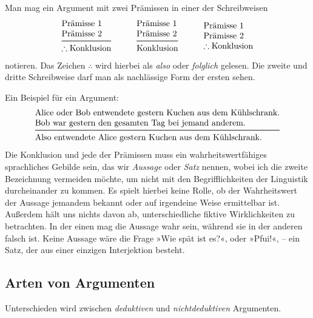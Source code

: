 Man mag ein Argument mit zwei Prämissen in einer der Schreibweisen
\[\begin{array}{@{}l@{}}
\text{Prämisse 1}\\
\text{Prämisse 2}\\
\midrule[\inferrulewidth]
\therefore\text{Konklusion}
\end{array}
\qquad\quad
\begin{array}{@{}l@{}}
\text{Prämisse 1}\\
\text{Prämisse 2}\\
\midrule[\inferrulewidth]
\text{Konklusion}
\end{array}
\qquad\quad
\begin{array}{@{}l@{}}
\text{Prämisse 1}\\
\text{Prämisse 2}\\
\therefore\text{Konklusion}
\end{array}
\]
notieren. Das Zeichen $\therefore$ wird hierbei als \emph{also} oder
\emph{folglich} gelesen. Die zweite und dritte Schreibweise darf man
als nachlässige Form der ersten sehen.

Ein Beispiel für ein Argument:
\[\begin{array}{@{}l@{}}
\text{Alice oder Bob entwendete gestern Kuchen aus dem Kühlschrank.}\\
\text{Bob war gestern den gesamten Tag bei jemand anderem.}\\
\midrule[\inferrulewidth]
\text{Also entwendete Alice gestern Kuchen aus dem Kühlschrank.}
\end{array}\]
Die Konklusion und jede der Prämissen muss ein wahrheitswertfähiges
sprachliches Gebilde sein, das wir \emph{Aussage} oder \emph{Satz}
nennen, wobei ich die zweite Bezeichnung vermeiden möchte, um nicht
mit den Begrifflichkeiten der Linguistik durcheinander zu kommen. Es
spielt hierbei keine Rolle, ob der Wahrheitswert der Aussage jemandem
bekannt oder auf irgendeine Weise ermittelbar ist.
Außerdem hält uns nichts davon ab, unterschiedliche fiktive Wirklichkeiten
zu betrachten. In der einen mag die Aussage wahr sein, während sie in der
anderen falsch ist. Keine Aussage wäre die Frage »Wie spät ist es?«, oder
»Pfui!«, -- ein Satz, der aus einer einzigen Interjektion
besteht.

\subsection{Arten von Argumenten}

Unterschieden wird zwischen \emph{deduktiven} und \emph{nichtdeduktiven}
Argumenten.

